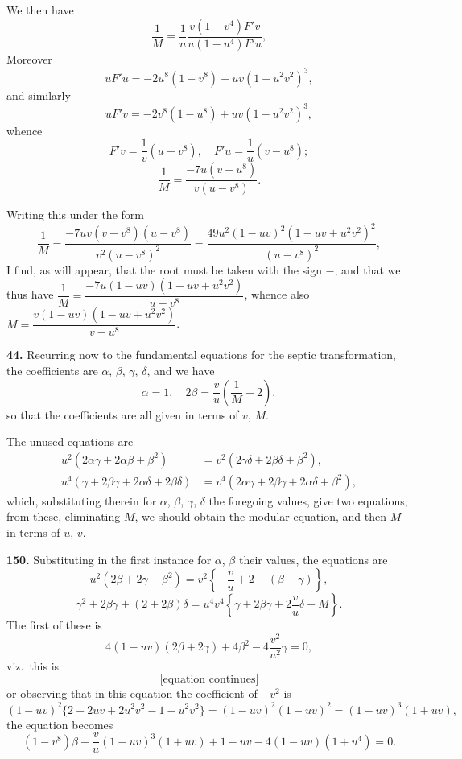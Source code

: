 \documentclass[11pt,a4paper]{book}
\begin{document}
We then have
\[
\frac{1}{M} = \frac{1}{n}\frac{v(1 - v^4)F'v}{u(1 - u^4)F'u},
\]
Moreover
\[
u F'u = -2u^8(1 - v^8) + uv(1 - u^2v^2)^3,
\]
and similarly
\[
u F'v = -2v^8(1 - u^8) + uv(1 - u^2v^2)^3,
\]
whence
\[
F'v = \frac{1}{v}(u - v^8), \quad F'u = \frac{1}{u}(v - u^8);
\]
\[
\frac{1}{M} = \frac{-7u(v - u^8)}{v(u - v^8)}.
\]

Writing this under the form
\[
\frac{1}{M} = \frac{-7uv(v - v^8)(u - v^8)}{v^2(u - v^8)^2} = \frac{49u^2(1 - uv)^2(1 - uv + u^2v^2)^2}{(u - v^8)^2},
\]
I find, as will appear, that the root must be taken with the sign $-$, and that we thus have $\dfrac{1}{M} = \dfrac{-7u(1 - uv)(1 - uv + u^2v^2)}{u - v^8}$, whence also $M = \dfrac{v(1 - uv)(1 - uv + u^2v^2)}{v - u^8}$.

\medskip
\noindent\textbf{44.} Recurring now to the fundamental equations for the septic transformation, the coefficients are $\alpha$, $\beta$, $\gamma$, $\delta$, and we have
\[
\alpha = 1, \quad 2\beta = \frac{v}{u}\left(\frac{1}{M} - 2\right),
\]
so that the coefficients are all given in terms of $v$, $M$.

The unused equations are
\begin{align*}
u^2(2\alpha\gamma + 2\alpha\beta + \beta^2) &= v^2(2\gamma\delta + 2\beta\delta + \beta^2), \\
u^4(\gamma + 2\beta\gamma + 2\alpha\delta + 2\beta\delta) &= v^4(2\alpha\gamma + 2\beta\gamma + 2\alpha\delta + \beta^2),
\end{align*}
which, substituting therein for $\alpha$, $\beta$, $\gamma$, $\delta$ the foregoing values, give two equations; from these, eliminating $M$, we should obtain the modular equation, and then $M$ in terms of $u$, $v$.


\noindent\textbf{150.} Substituting in the first instance for $\alpha$, $\beta$ their values, the equations are
\[
u^2(2\beta + 2\gamma + \beta^2) = v^2\left\{-\frac{v}{u} + 2 - (\beta + \gamma)\right\},
\]
\[
\gamma^2 + 2\beta\gamma + (2 + 2\beta)\delta = u^4v^4\left\{\gamma + 2\beta\gamma + 2\frac{v}{u}\delta + M\right\}.
\]
The first of these is
\[
4(1 - uv)(2\beta + 2\gamma) + 4\beta^2 - 4\frac{v^2}{u^2}\gamma = 0,
\]
viz.\ this is
\[
\text{[equation continues]}
\]
or observing that in this equation the coefficient of $-v^2$ is
\[
(1 - uv)^2\{2 - 2uv + 2u^2v^2 - 1 - u^2v^2\} = (1 - uv)^2(1 - uv)^2 = (1 - uv)^3(1 + uv),
\]
the equation becomes
\[
(1 - v^8)\beta + \frac{v}{u}(1 - uv)^3(1 + uv) + 1 - uv - 4(1 - uv)(1 + u^4) = 0.
\]
\end{document}
